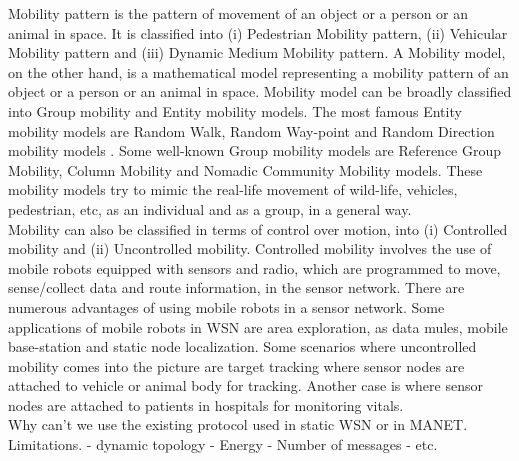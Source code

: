 \documentclass[a4paper, conference, 10pt]{IEEEtran}
\begin{document}



 Mobility pattern is the pattern of movement of an object or a person or an animal in space. It is classified \cite{mobileMACSurvey} into (i) Pedestrian Mobility pattern, (ii) Vehicular Mobility pattern and (iii) Dynamic Medium Mobility pattern.  A Mobility model, on the other hand, is a mathematical model representing a mobility pattern of an object or a person or an animal in space. Mobility model can be broadly classified into Group mobility and Entity mobility models. The most famous Entity mobility models are Random Walk, Random Way-point and Random Direction mobility models \cite{mobModelsSurvey}. Some well-known Group mobility models are Reference Group Mobility, Column Mobility and Nomadic Community Mobility models. These mobility models try to mimic the real-life movement of wild-life, vehicles, pedestrian, etc, as an individual and as a group, in a general way.\\ 

Mobility can also be classified in terms of control over motion, into (i) Controlled mobility and (ii) Uncontrolled mobility. Controlled mobility involves the use of mobile robots equipped with sensors and radio, which are programmed to move, sense/collect data and route information, in the sensor network. There are numerous advantages of using mobile robots in a sensor network. Some applications of mobile robots in WSN are area exploration, as data mules, mobile base-station and static node localization. Some scenarios where uncontrolled mobility comes into the picture are target tracking where sensor nodes are attached to vehicle or animal body for tracking. Another case is where sensor nodes are attached to patients in hospitals for monitoring vitals.\\


Why can't we use the existing protocol used in static WSN or in MANET. Limitations. - dynamic topology - Energy - Number of messages - etc.
\end{document}
